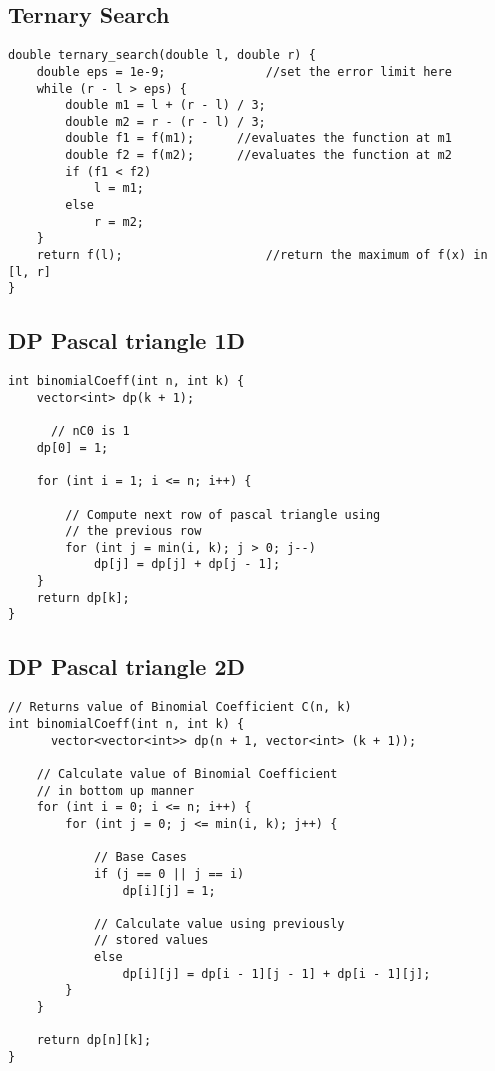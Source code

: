 \documentclass[10pt]{article}
\begin{document}
\begin{multicols*}{2}
\subsection{Ternary Search}
\begin{lstlisting}[style=compactcpp]
double ternary_search(double l, double r) {
    double eps = 1e-9;              //set the error limit here
    while (r - l > eps) {
        double m1 = l + (r - l) / 3;
        double m2 = r - (r - l) / 3;
        double f1 = f(m1);      //evaluates the function at m1
        double f2 = f(m2);      //evaluates the function at m2
        if (f1 < f2)
            l = m1;
        else
            r = m2;
    }
    return f(l);                    //return the maximum of f(x) in [l, r]
}
\end{lstlisting}
\subsection{DP Pascal triangle 1D}
\begin{lstlisting}[style=compactcpp]
int binomialCoeff(int n, int k) {
    vector<int> dp(k + 1);

      // nC0 is 1
    dp[0] = 1; 

    for (int i = 1; i <= n; i++) {
      
        // Compute next row of pascal triangle using
        // the previous row
        for (int j = min(i, k); j > 0; j--)
            dp[j] = dp[j] + dp[j - 1];
    }
    return dp[k];
}
\end{lstlisting}
\subsection{DP Pascal triangle 2D}
\begin{lstlisting}[style=compactcpp]
    // Returns value of Binomial Coefficient C(n, k)
int binomialCoeff(int n, int k) {
      vector<vector<int>> dp(n + 1, vector<int> (k + 1));
  
    // Calculate value of Binomial Coefficient
    // in bottom up manner
    for (int i = 0; i <= n; i++) {
        for (int j = 0; j <= min(i, k); j++) {
          
            // Base Cases
            if (j == 0 || j == i)
                dp[i][j] = 1;

            // Calculate value using previously
            // stored values
            else
                dp[i][j] = dp[i - 1][j - 1] + dp[i - 1][j];
        }
    }

    return dp[n][k];
}
    

\end{lstlisting}
\end{multicols*}
\end{document}
